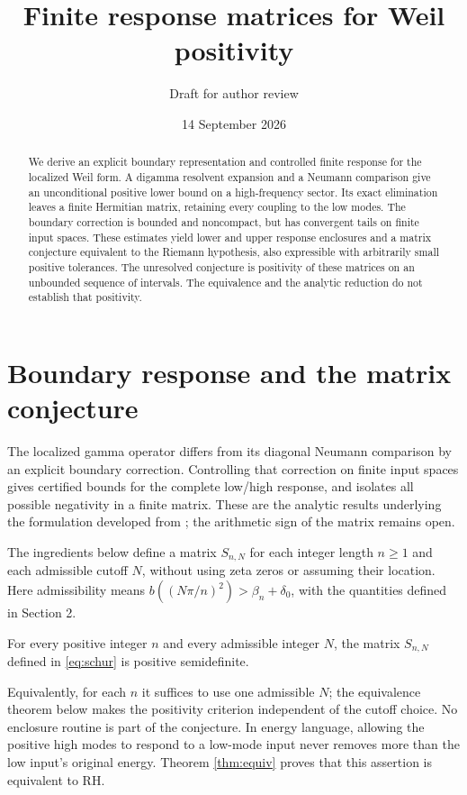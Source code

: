 
\newcommand{\MainManuscript}{1}
\title{Finite response matrices for Weil positivity}
\author{Draft for author review}
\date{14 September 2026}
\maketitle
\begin{abstract}
We derive an explicit boundary representation and controlled finite response
for the localized Weil form. A digamma resolvent expansion and a Neumann
comparison give an unconditional positive lower bound on a high-frequency
sector. Its exact elimination leaves a finite Hermitian matrix, retaining
every coupling to the low modes. The boundary correction is bounded and
noncompact, but has convergent tails on finite input spaces. These estimates
yield lower and upper response enclosures and a matrix conjecture equivalent
to the Riemann hypothesis, also expressible with arbitrarily small positive
tolerances. The unresolved conjecture is positivity of these
matrices on an unbounded sequence of intervals. The equivalence and the analytic
reduction do not establish that positivity.
\end{abstract}

\section{Boundary response and the matrix conjecture}
The localized gamma operator differs from its diagonal Neumann comparison
by an explicit boundary correction. Controlling that correction on finite
input spaces gives certified bounds for the complete low/high response,
and isolates all possible negativity in a finite matrix.
These are the analytic results underlying the formulation developed from
\cite{Investigation}; the arithmetic sign of the matrix remains open.

The ingredients below define a matrix $S_{n,N}$ for each integer length
$n\ge1$ and each admissible cutoff $N$, without using zeta zeros or assuming
their location. Here admissibility means
$b((N\pi/n)^2)>\beta_n+\delta_0$, with the quantities defined in Section 2.
\begin{conjecture}\label{conj:main}
For every positive integer $n$ and every admissible integer $N$, the matrix
$S_{n,N}$ defined in \eqref{eq:schur} is positive semidefinite.
\end{conjecture}
Equivalently, for each $n$ it suffices to use one admissible $N$; the
equivalence theorem below makes the positivity criterion independent of
the cutoff choice. No enclosure routine is part of the conjecture.
In energy language, allowing the positive high modes to respond to a low-mode
input never removes more than the low input's original energy. Theorem
\ref{thm:equiv} proves that this assertion is equivalent to RH.

